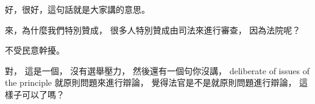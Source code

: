 \hypertarget{w06:cue:1592}{}好，很好，這句話就是大家講的意思。

\hypertarget{w06:cue:1593}{}來，為什麼我們特別贊成，
\hypertarget{w06:cue:1594}{}很多人特別贊成由司法來進行審查，
\hypertarget{w06:cue:1595}{}因為法院呢？

\hypertarget{w06:cue:1596}{}不受民意幹擾。

\hypertarget{w06:cue:1597}{}對，
\hypertarget{w06:cue:1598}{}這是一個，
\hypertarget{w06:cue:1599}{}沒有選舉壓力，
\hypertarget{w06:cue:1600}{}然後還有一個句你沒講，
\hypertarget{w06:cue:1601}{}deliberate of issues of the principle
\hypertarget{w06:cue:1602}{}就原則問題來進行辯論，
\hypertarget{w06:cue:1603}{}覺得法官是不是就原則問題進行辯論，
\hypertarget{w06:cue:1604}{}這樣子可以了嗎？

